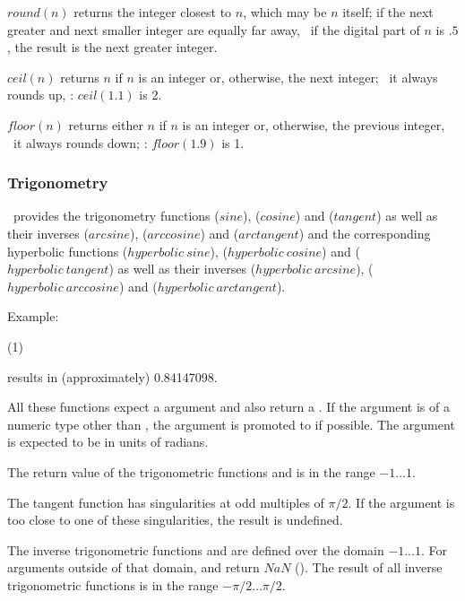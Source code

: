 $round(n)$ returns the integer closest to $n$,
which may be $n$ itself; if the next greater and
next smaller integer are equally far away,
\ie\ if the digital part of $n$ is $.5$,
the result is the next greater integer.

$ceil(n)$ returns $n$ if $n$ is an integer or,
otherwise, the next integer;
\ie\ it always rounds up, \eg: $ceil(1.1)$ is 2.

$floor(n)$ returns either $n$ if $n$ is an integer
or, otherwise, the previous integer, \ie\ it always rounds down;
\eg: $floor(1.9)$ is 1.

\subsubsection{Trigonometry}
\nowdb\ provides the trigonometry functions
 ($sine$),
 ($cosine$) and
 ($tangent$)
as well as their inverses
 ($arcsine$),
 ($arccosine$) and
 ($arctangent$) and
the corresponding hyperbolic functions
 ($hyperbolic\ sine$),
 ($hyperbolic\ cosine$) and
 ($hyperbolic\ tangent$)
as well as their inverses
 ($hyperbolic\ arcsine$),
 ($hyperbolic\ arccosine$) and
 ($hyperbolic\ arctangent$).

Example:

 (1)
 

results in (approximately) 0.84147098.

All these functions expect a  argument
and also return a .
If the argument is of a numeric type other than ,
the argument is promoted to  if possible.
The argument is expected to be in units of radians.

The return value of the trigonometric functions
 and  is in the range $-1\dots 1$.

The tangent function has singularities at odd multiples of $\pi/2$.
If the argument is too close to one of these singularities,
the result is undefined.

The inverse trigonometric functions
 and 
are defined over the domain $-1\dots 1$.
For arguments outside of that domain,
 and 
return $NaN$ ().
The result of all inverse trigonometric functions
is in the range $-\pi/2\dots\pi/2$.

